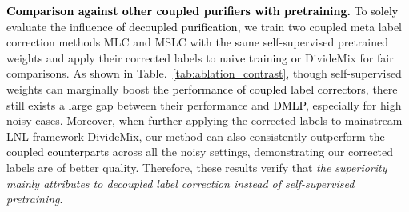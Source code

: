 \documentclass[10pt,twocolumn,letterpaper]{article}
\newcommand{\lyx}[1]{\textcolor{black}{#1}}
\begin{document}
\textbf{\lyx{Comparison against other coupled purifiers with pretraining.}} To \lyx{solely} evaluate the influence \lyx{of decoupled purification}, we train two coupled meta label correction methods MLC and MSLC with \lyx{the same} self-supervised pretrained weights and apply their corrected labels to \lyx{naive training or} DivideMix for fair comparisons. As shown in Table.~\ref{tab:ablation_contrast}, though self-supervised weights can marginally boost \lyx{the performance of coupled label correctors}, there still exists a large gap between their performance and \lyx{DMLP}, especially for high noisy cases. Moreover, when further applying the corrected labels to mainstream LNL framework DivideMix, our method can also consistently outperform \lyx{the coupled counterparts} across all the noisy settings, demonstrating our corrected labels are of better quality. Therefore, these results verify that \emph{the superiority mainly attributes to decoupled label correction instead of self-supervised pretraining}.    
 
\end{document}
